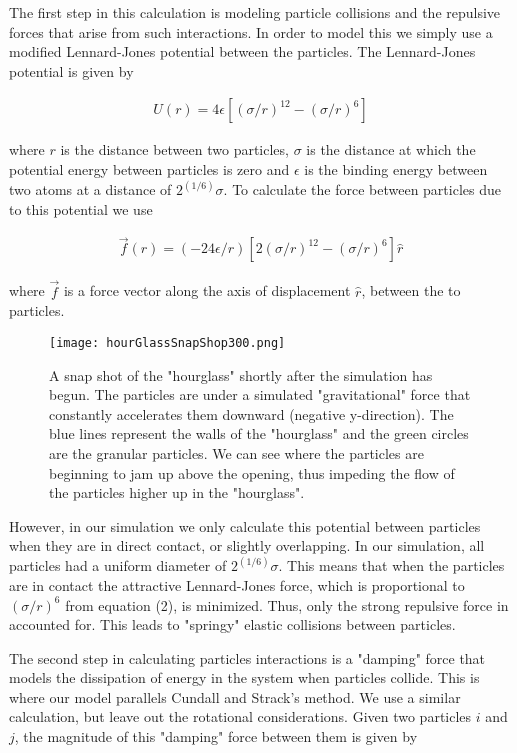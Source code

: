 \documentclass{article}%
\begin{document}
	The first step in this calculation is modeling particle collisions and the repulsive forces that arise from such interactions. In order to model this we simply use a modified Lennard-Jones potential between the particles. The Lennard-Jones potential is given by
	
\begin{align}
	U(r) = 4\epsilon[(\sigma/r)^{12} - (\sigma/r)^6]
\end{align}

where $r$ is the distance between two particles, $\sigma$ is the distance at which the potential energy between particles is zero and $\epsilon$ is the binding energy between two atoms at a distance of $2^{(1/6)}\sigma$. To calculate the force between particles due to this potential we use




\begin{align}
	\vec{f}(r) = (-24\epsilon/r)[2(\sigma/r)^{12} - (\sigma/r)^6]\hat{r}
\end{align}

where $\vec{f}$ is a force vector along the axis of displacement $\hat{r}$, between the to particles.

\begin{figure}[t]
	\centering
		\texttt{[image: hourGlassSnapShop300.png]}
	\label{fig:fig01} 
	\caption{A snap shot of the "hourglass" shortly after the simulation has begun. The particles are under a simulated "gravitational" force that constantly accelerates them downward (negative y-direction). The blue lines represent the walls of the "hourglass" and the green circles are the granular particles. We can see where the particles are beginning to jam up above the opening, thus impeding the flow of the particles higher up in the "hourglass".} 
	
\end{figure}

 However, in our simulation we only calculate this potential between particles when they are in direct contact, or slightly overlapping. In our simulation, all particles had a uniform diameter of $2^{(1/6)}\sigma$. This means that when the particles are in contact the attractive Lennard-Jones force, which is proportional to $(\sigma/r)^6$ from equation (2), is minimized. Thus, only the strong repulsive force in accounted for. This leads to "springy" elastic collisions between particles.
 
 The second step in calculating particles interactions is a "damping" force that models the dissipation of energy in the system when particles collide. This is where our model parallels Cundall and Strack's method. We use a similar calculation, but leave out the rotational considerations. Given two particles $i$ and $j$, the magnitude of this "damping" force between them is given by
\end{document}

